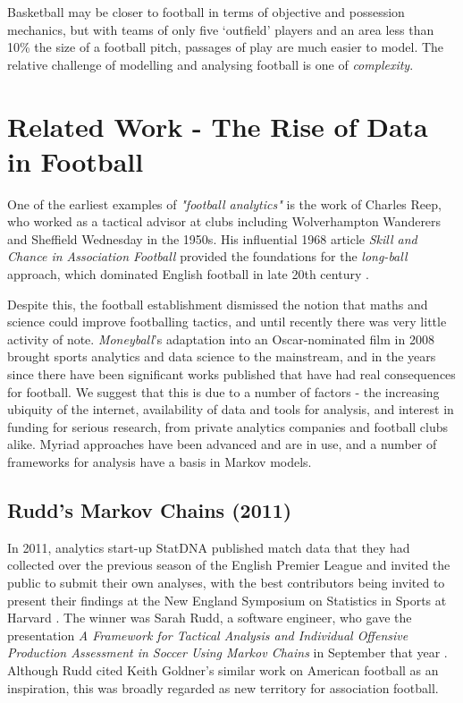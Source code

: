 \documentclass{l4proj}
\begin{document}
Basketball may be closer to football in terms of objective and possession mechanics, but with teams of only five `outfield' players and an area less than 10\% the size of a football pitch, passages of play are much easier to model. The relative challenge of modelling and analysing football is one of \textit{complexity}. 

\section{Related Work - The Rise of Data in Football}

One of the earliest examples of \textit{"football analytics"} is the work of Charles Reep, who worked as a tactical advisor at clubs including Wolverhampton Wanderers and Sheffield Wednesday in the 1950s. His influential 1968 article \textit{Skill and Chance in Association Football} \cite{reep1} provided the foundations for the \textit{long-ball} approach, which dominated English football in late 20th century \cite{wils1}.

Despite this, the football establishment dismissed the notion that maths and science could improve footballing tactics, and until recently there was very little activity of note. \textit{Moneyball}'s adaptation into an Oscar-nominated film in 2008 brought sports analytics and data science to the mainstream, and in the years since there have been significant works published that have had real consequences for football. We suggest that this is due to a number of factors - the increasing ubiquity of the internet, availability of data and tools for analysis, and interest in funding for serious research, from private analytics companies and football clubs alike. Myriad approaches have been advanced and are in use, and a number of frameworks for analysis have a basis in Markov models.

\subsection{Rudd's Markov Chains (2011)}

In 2011, analytics start-up StatDNA published match data that they had collected over the previous season of the English Premier League and invited the public to submit their own analyses, with the best contributors being invited to present their findings at the New England Symposium on Statistics in Sports at Harvard \cite{sump1}. The winner was Sarah Rudd, a software engineer, who gave the presentation \textit{A Framework for Tactical Analysis and Individual Offensive Production Assessment in Soccer Using Markov Chains} in September that year \cite{rudd1}. Although Rudd cited Keith Goldner's similar work \cite{gold1} on American football as an inspiration, this was broadly regarded as new territory for association football. 
\end{document}
